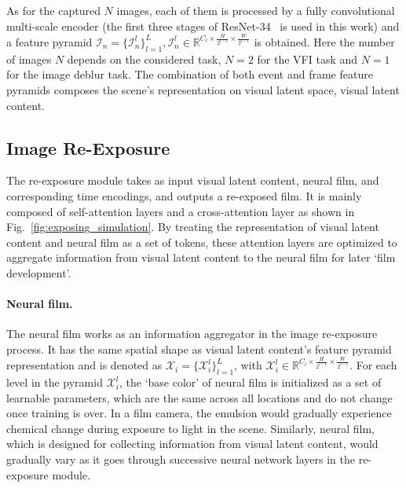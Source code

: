 \documentclass[10pt,twocolumn,letterpaper]{article}
\begin{document}
As for the captured $N$ images, each of them is processed by a fully convolutional multi-scale encoder 
(the first three stages of ResNet-34~\cite{ResNet} is used in this work) and a feature pyramid $\mathcal{I}_n=\{ \mathcal{I}^l_n \}_{l=1}^{L}, \mathcal{I}^l_n \in \mathbb{R}^{C_l\times\frac{H}{2^{l-1}}\times\frac{W}{2^{l-1}}}$ is obtained. 
Here the number of images $N$ depends on the considered task, \eg $N=2$ for the VFI task and $N=1$ for the image deblur task.
The combination of both event and frame feature pyramids composes the scene's representation on visual latent space, \ie visual latent content.



\subsection{Image Re-Exposure}
The re-exposure module takes as input visual latent content, neural film, and corresponding time encodings, and outputs a re-exposed film.
It is mainly composed of self-attention layers and a cross-attention layer as shown in Fig.~\ref{fig:exposing_simulation}.
By treating the representation of visual latent content and neural film as a set of tokens, these attention layers are optimized to aggregate information from visual latent content to the neural film for later `film development'.


\paragraph{Neural film.} 
The neural film works as an information aggregator in the image re-exposure process.
It has the same spatial shape as visual latent content's feature pyramid representation and is denoted as $\mathcal{X}_i=\{ \mathcal{X}^l_i \}^L_{l=1}$, with $\mathcal{X}^l_i \in \mathbb{R}^{C_l\times\frac{H}{2^{l-1}}\times\frac{W}{2^{l-1}}}$.
For each level in the pyramid $\mathcal{X}^l_i$, the `base color' of neural film is initialized as a set of learnable parameters, which are the same across all locations and do not change once training is over.
In a film camera, the emulsion would gradually experience chemical change during exposure to light in the scene.
Similarly, neural film, which is designed for collecting information from visual latent content, would gradually vary as it goes through successive neural network layers in the re-exposure module.
\end{document}
